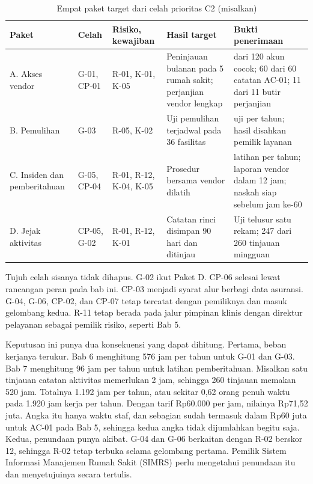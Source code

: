 \begin{table}[!htb]
  \centering\small
  \caption{Empat paket target dari celah prioritas C2 (misalkan)}\label{tab:ch08-paket}
  \begin{tabularx}{\textwidth}{|>{\raggedright\arraybackslash}p{}|>{\raggedright\arraybackslash}p{}|>{\raggedright\arraybackslash}p{}|>{\raggedright\arraybackslash}X|>{\raggedright\arraybackslash}X|}
    \hline
    \textbf{Paket} & \textbf{Celah} & \textbf{Risiko, kewajiban} & \textbf{Hasil target} &
    \textbf{Bukti penerimaan} \\ \hline
    A. Akses vendor & G-01, CP-01 & R-01, K-01, K-05 & Peninjauan bulanan pada 5 rumah sakit;
    perjanjian vendor lengkap & 120 dari 120 akun cocok; 60 dari 60 catatan AC-01; 11 dari 11
    butir perjanjian \\ \hline
    B. Pemulihan & G-03 & R-05, K-02 & Uji pemulihan terjadwal pada 36 fasilitas & 144 uji per
    tahun; hasil disahkan pemilik layanan \\ \hline
    C. Insiden dan pemberitahuan & G-05, CP-04 & R-01, R-12, K-04, K-05 & Prosedur bersama
    vendor dilatih & 2 latihan per tahun; laporan vendor dalam 12 jam; naskah siap sebelum jam
    ke-60 \\ \hline
    D. Jejak aktivitas & CP-05, G-02 & R-01, R-12, K-01 & Catatan rinci disimpan 90 hari dan
    ditinjau & Uji telusur satu rekam; 247 dari 260 tinjauan mingguan \\ \hline
  \end{tabularx}
\end{table}

Tujuh celah sisanya tidak dihapus. G-02 ikut Paket D. CP-06 selesai lewat rancangan peran pada
bab ini. CP-03 menjadi syarat alur berbagi data asuransi. G-04, G-06, CP-02, dan CP-07 tetap
tercatat dengan pemiliknya dan masuk gelombang kedua. R-11 tetap berada pada jalur pimpinan
klinis dengan direktur pelayanan sebagai pemilik risiko, seperti Bab 5.

Keputusan ini punya dua konsekuensi yang dapat dihitung. Pertama, beban kerjanya terukur. Bab 6
menghitung 576 jam per tahun untuk G-01 dan G-03. Bab 7 menghitung 96 jam per tahun untuk
latihan pemberitahuan. Misalkan satu tinjauan catatan aktivitas memerlukan 2 jam, sehingga 260
tinjauan memakan 520 jam. Totalnya 1.192 jam per tahun, atau sekitar 0,62 orang penuh waktu pada
1.920 jam kerja per tahun. Dengan tarif Rp60.000 per jam, nilainya Rp71,52 juta. Angka itu hanya
waktu staf, dan sebagian sudah termasuk dalam Rp60 juta untuk AC-01 pada Bab 5, sehingga kedua
angka tidak dijumlahkan begitu saja. Kedua, penundaan punya akibat. G-04 dan G-06 berkaitan
dengan R-02 berskor 12, sehingga R-02 tetap terbuka selama gelombang pertama. Pemilik Sistem
Informasi Manajemen Rumah Sakit (SIMRS) perlu mengetahui penundaan itu dan menyetujuinya secara
tertulis.

